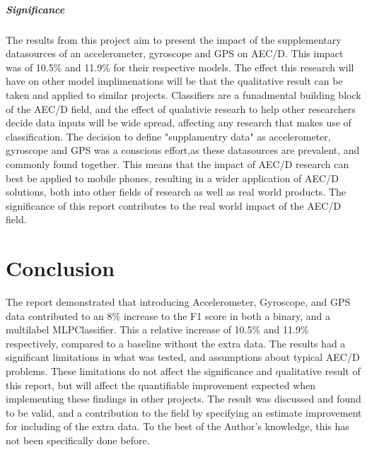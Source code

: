 \documentclass{UoNMCHA}
\numberwithin{equation}{section}
\begin{document}
\subparagraph{Significance} %
The results from this project aim to present the impact of the supplementary datasources of an accelerometer, gyroscope and GPS on AEC/D. This impact was of 10.5\% and 11.9\% for their respective models. The effect this research will have on other model implimenations will be that the qualitative result can be taken and applied to similar projects. Classifiers are a funadmental building block of the AEC/D field, and the effect of qualativie researh to help other researchers decide data inputs will be wide spread, affecting any research that makes use of classification. The decision to define "supplamentry data" as accelerometer, gyroscope and GPS was a conscious effort,as these datasources are prevalent, and commonly found together. This means that the impact of AEC/D research can best be applied to mobile phones, resulting in a wider application of AEC/D solutions, both into other fields of research as well as real world products. The significance of this report contributes to the real world impact of the AEC/D field.






\clearpage \section{Conclusion}\label{sec:Conclusion}

The report demonstrated that introducing Accelerometer, Gyroscope, and GPS data contributed to an 8\% increase to the F1 score in both a binary, and a multilabel MLPClassifier. This a relative increase of 10.5\% and 11.9\% respectively, compared to a baseline without the extra data. The results had a significant limitations in what was tested, and assumptions about typical AEC/D problems. These limitations do not affect the significance and qualitative result of this report, but will affect the quantifiable improvement expected when implementing these findings in other projects. 
The result was discussed and found to be valid, and a contribution to the field by specifying an estimate improvement for including of the extra data. To the best of the Author's knowledge, this has not been specifically done before.
\end{document}
